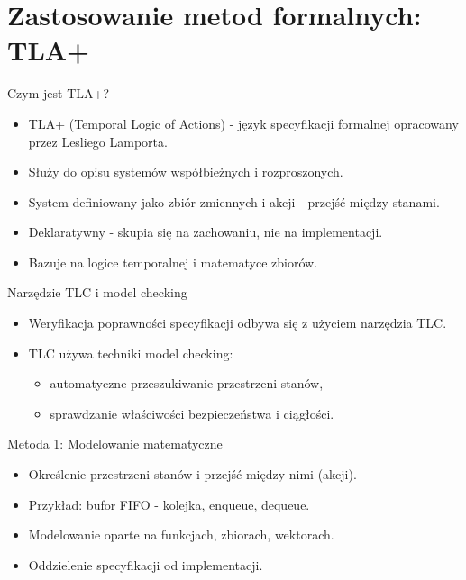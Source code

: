\documentclass{beamer}
\begin{document}
\section{Zastosowanie metod formalnych: TLA+}
\begin{frame}{Czym jest TLA+?}
  \begin{itemize}
      \item TLA+ (Temporal Logic of Actions) - język specyfikacji formalnej opracowany przez Lesliego Lamporta.
      \item Służy do opisu systemów współbieżnych i rozproszonych.
      \item System definiowany jako zbiór zmiennych i akcji - przejść między stanami.
      \item Deklaratywny - skupia się na zachowaniu, nie na implementacji.
      \item Bazuje na logice temporalnej i matematyce zbiorów.
  \end{itemize}
\end{frame}

\begin{frame}{Narzędzie TLC i model checking}
  \begin{itemize}
      \item Weryfikacja poprawności specyfikacji odbywa się z użyciem narzędzia TLC.
      \item TLC używa techniki model checking:
      \begin{itemize}
          \item automatyczne przeszukiwanie przestrzeni stanów,
          \item sprawdzanie właściwości bezpieczeństwa i ciągłości.
      \end{itemize}
  \end{itemize}
\end{frame}

\begin{frame}{Metoda 1: Modelowanie matematyczne}
  \begin{itemize}
      \item Określenie przestrzeni stanów i przejść między nimi (akcji).
      \item Przykład: bufor FIFO - kolejka, enqueue, dequeue.
      \item Modelowanie oparte na funkcjach, zbiorach, wektorach.
      \item Oddzielenie specyfikacji od implementacji.
  \end{itemize}
\end{frame}
\end{document}
